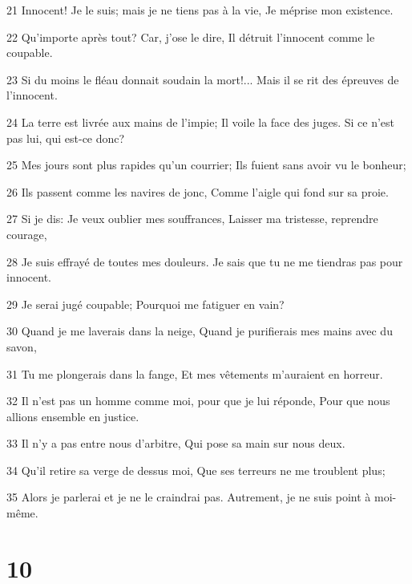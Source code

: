 \par 21 Innocent! Je le suis; mais je ne tiens pas à la vie, Je méprise mon existence.
\par 22 Qu'importe après tout? Car, j'ose le dire, Il détruit l'innocent comme le coupable.
\par 23 Si du moins le fléau donnait soudain la mort!... Mais il se rit des épreuves de l'innocent.
\par 24 La terre est livrée aux mains de l'impie; Il voile la face des juges. Si ce n'est pas lui, qui est-ce donc?
\par 25 Mes jours sont plus rapides qu'un courrier; Ils fuient sans avoir vu le bonheur;
\par 26 Ils passent comme les navires de jonc, Comme l'aigle qui fond sur sa proie.
\par 27 Si je dis: Je veux oublier mes souffrances, Laisser ma tristesse, reprendre courage,
\par 28 Je suis effrayé de toutes mes douleurs. Je sais que tu ne me tiendras pas pour innocent.
\par 29 Je serai jugé coupable; Pourquoi me fatiguer en vain?
\par 30 Quand je me laverais dans la neige, Quand je purifierais mes mains avec du savon,
\par 31 Tu me plongerais dans la fange, Et mes vêtements m'auraient en horreur.
\par 32 Il n'est pas un homme comme moi, pour que je lui réponde, Pour que nous allions ensemble en justice.
\par 33 Il n'y a pas entre nous d'arbitre, Qui pose sa main sur nous deux.
\par 34 Qu'il retire sa verge de dessus moi, Que ses terreurs ne me troublent plus;
\par 35 Alors je parlerai et je ne le craindrai pas. Autrement, je ne suis point à moi-même.

\chapter{10}

